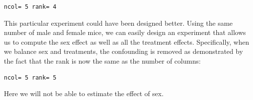 \documentclass[
  letterpaper,
  DIV=11,
  numbers=noendperiod]{scrartcl}
\newenvironment{Shaded}{\begin{snugshade}}{\end{snugshade}}
\newcommand{\DecValTok}[1]{\textcolor[rgb]{0.68,0.00,0.00}{#1}}
\newcommand{\FunctionTok}[1]{\textcolor[rgb]{0.28,0.35,0.67}{#1}}
\newcommand{\NormalTok}[1]{\textcolor[rgb]{0.00,0.23,0.31}{#1}}
\newcommand{\OtherTok}[1]{\textcolor[rgb]{0.00,0.23,0.31}{#1}}
\newcommand{\SpecialCharTok}[1]{\textcolor[rgb]{0.37,0.37,0.37}{#1}}
\newcommand{\StringTok}[1]{\textcolor[rgb]{0.13,0.47,0.30}{#1}}
\begin{document}
\begin{verbatim}
ncol= 5 rank= 4 
\end{verbatim}

This particular experiment could have been designed better. Using the
same number of male and female mice, we can easily design an experiment
that allows us to compute the sex effect as well as all the treatment
effects. Specifically, when we balance sex and treatments, the
confounding is removed as demonstrated by the fact that the rank is now
the same as the number of columns:

\begin{Shaded}
\end{Shaded}

\begin{verbatim}
ncol= 5 rank= 5 
\end{verbatim}

Here we will not be able to estimate the effect of sex.
\end{document}
